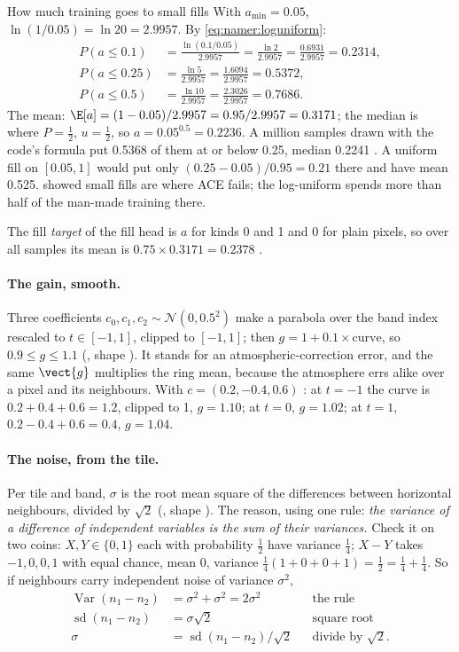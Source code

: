 \begin{worked}[label={we:namer:fill}]{How much training goes to small fills}
With $a_{\min}=0.05$, $\ln(1/0.05)=\ln20=2.9957$. By \cref{eq:namer:loguniform}:
\begin{align*}
P(a\le0.1) &= \frac{\ln(0.1/0.05)}{2.9957}=\frac{\ln2}{2.9957}=\frac{0.6931}{2.9957}=0.2314,\\
P(a\le0.25) &= \frac{\ln5}{2.9957}=\frac{1.6094}{2.9957}=0.5372,\\
P(a\le0.5) &= \frac{\ln10}{2.9957}=\frac{2.3026}{2.9957}=0.7686 .
\end{align*}
The mean: $\E[a]=(1-0.05)/2.9957=0.95/2.9957=0.3171$; the median is where $P=\frac12$, $u=\frac12$, so
$a=0.05^{0.5}=0.2236$. A million samples drawn with the code's formula put 0.5368 of them at or below 0.25, median
0.2241 \tagC. A uniform fill on $[0.05,1]$ would put only $(0.25-0.05)/0.95=0.21$ there and have mean 0.525.
 showed small fills are where ACE fails; the log-uniform spends more than half of the
man-made training there.
\end{worked}

The fill \emph{target} of the fill head is $a$ for kinds 0 and 1 and 0 for plain pixels, so over all samples its mean
is $0.75\times0.3171=0.2378$ \tagC.

\paragraph{The gain, smooth.} Three coefficients $c_0,c_1,c_2\sim\mathcal{N}(0,0.5^2)$ make a parabola over the band
index rescaled to $t\in[-1,1]$, clipped to $[-1,1]$; then $g=1+0.1\times\text{curve}$, so $0.9\le g\le1.1$
(, shape ). It stands for an atmospheric-correction error, and the same $\vect{g}$
multiplies the ring mean, because the atmosphere errs alike over a pixel and its neighbours. With $c=(0.2,-0.4,0.6)$
\tagA: at $t=-1$ the curve is $0.2+0.4+0.6=1.2$, clipped to 1, $g=1.10$; at $t=0$, $g=1.02$; at $t=1$,
$0.2-0.4+0.6=0.4$, $g=1.04$.

\paragraph{The noise, from the tile.} Per tile and band, $\sigma$ is the root mean square of the differences between
horizontal neighbours, divided by $\sqrt2$ (, shape ). The reason, using one rule:
\emph{the variance of a difference of independent variables is the sum of their variances.} Check it on two coins:
$X,Y\in\{0,1\}$ each with probability $\frac12$ have variance $\frac14$; $X-Y$ takes $-1,0,0,1$ with equal chance, mean
0, variance $\frac14(1+0+0+1)=\frac12=\frac14+\frac14$. So if neighbours carry independent noise of variance
$\sigma^2$,
\begin{align*}
\operatorname{Var}(n_1-n_2) &= \sigma^2+\sigma^2 = 2\sigma^2 &&\text{the rule}\\
\operatorname{sd}(n_1-n_2) &= \sigma\sqrt2 &&\text{square root}\\
\sigma &= \operatorname{sd}(n_1-n_2)/\sqrt2 &&\text{divide by }\sqrt2 .
\end{align*}

